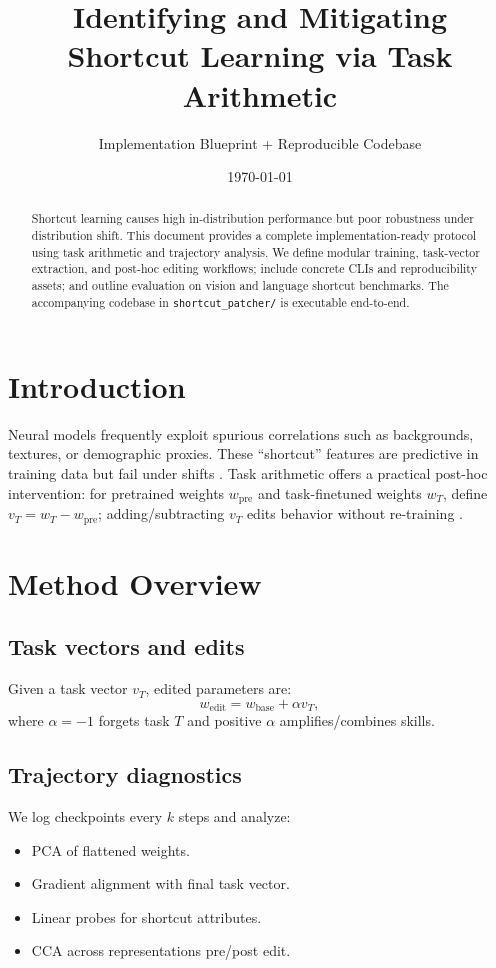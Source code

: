 \documentclass[11pt]{article}
\title{Identifying and Mitigating Shortcut Learning via Task Arithmetic}
\author{Implementation Blueprint + Reproducible Codebase}
\date{\today}
\begin{document}
\maketitle

\begin{abstract}
Shortcut learning causes high in-distribution performance but poor robustness under distribution shift. This document provides a complete implementation-ready protocol using task arithmetic and trajectory analysis. We define modular training, task-vector extraction, and post-hoc editing workflows; include concrete CLIs and reproducibility assets; and outline evaluation on vision and language shortcut benchmarks. The accompanying codebase in \texttt{shortcut\_patcher/} is executable end-to-end.
\end{abstract}

\section{Introduction}
Neural models frequently exploit spurious correlations such as backgrounds, textures, or demographic proxies. These ``shortcut'' features are predictive in training data but fail under shifts \cite{geirhos2020shortcut,murali2023spurious}. Task arithmetic offers a practical post-hoc intervention: for pretrained weights $w_{\text{pre}}$ and task-finetuned weights $w_T$, define $v_T = w_T - w_{\text{pre}}$; adding/subtracting $v_T$ edits behavior without re-training \cite{ilharco2023task}.

\section{Method Overview}
\subsection{Task vectors and edits}
Given a task vector $v_T$, edited parameters are:
\begin{equation}
w_{\text{edit}} = w_{\text{base}} + \alpha v_T,
\end{equation}
where $\alpha=-1$ forgets task $T$ and positive $\alpha$ amplifies/combines skills.

\subsection{Trajectory diagnostics}
We log checkpoints every $k$ steps and analyze:
\begin{itemize}[leftmargin=*]
  \item PCA of flattened weights.
  \item Gradient alignment with final task vector.
  \item Linear probes for shortcut attributes.
  \item CCA across representations pre/post edit.
\end{itemize}
\end{document}
